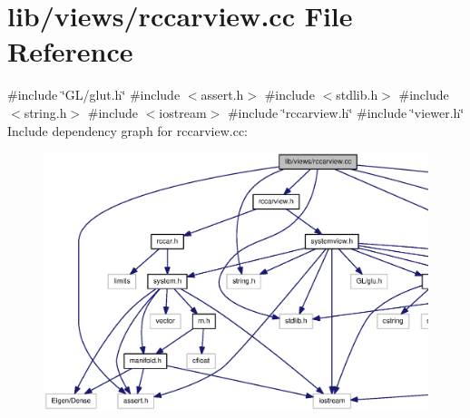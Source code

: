 \section{lib/views/rccarview.cc \-File \-Reference}
\label{rccarview_8cc}
{\ttfamily \#include \char`\"{}\-G\-L/glut.\-h\char`\"{}}\*
{\ttfamily \#include $<$assert.\-h$>$}\*
{\ttfamily \#include $<$stdlib.\-h$>$}\*
{\ttfamily \#include $<$string.\-h$>$}\*
{\ttfamily \#include $<$iostream$>$}\*
{\ttfamily \#include \char`\"{}rccarview.\-h\char`\"{}}\*
{\ttfamily \#include \char`\"{}viewer.\-h\char`\"{}}\*
\-Include dependency graph for rccarview.\-cc\-:
\nopagebreak
\begin{figure}[H]
\begin{center}
\leavevmode
\includegraphics[width=350pt]{rccarview_8cc__incl}
\end{center}
\end{figure}
